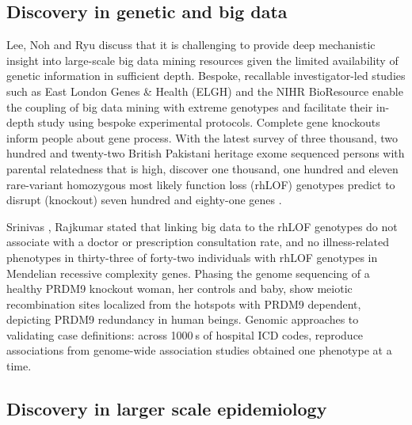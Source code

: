 \documentclass[sigconf]{acmart}
\begin{document}
\subsection{Discovery in genetic and big data}
Lee, Noh and Ryu \cite{lee2011ire1} discuss that it is challenging to provide deep mechanistic insight into large-scale big data mining resources given the limited availability of genetic information in sufficient depth. Bespoke, recallable investigator-led studies such as East London Genes & Health (ELGH) and the NIHR BioResource enable the coupling of big data mining with extreme genotypes and facilitate their in-depth study using bespoke experimental protocols. Complete gene knockouts inform people about gene process. With the latest survey of three thousand, two hundred and twenty-two  British Pakistani heritage exome sequenced persons with parental relatedness that is high, discover one thousand, one hundred and eleven rare-variant homozygous most likely function loss (rhLOF) genotypes predict to disrupt (knockout) seven hundred and eighty-one genes \cite{wang2005framingham}.
\par Srinivas \cite{srinivas2010analysis}, Rajkumar \cite{rajkumar2010diagnosis} stated that linking big data to the rhLOF genotypes do not associate with a doctor or prescription consultation rate, and no illness-related phenotypes in thirty-three of forty-two individuals with rhLOF genotypes in Mendelian recessive complexity genes. Phasing the genome sequencing of a healthy PRDM9 knockout woman, her controls and baby, show meiotic recombination sites localized from the hotspots with PRDM9 dependent, depicting PRDM9 redundancy in human beings. Genomic approaches to validating case definitions: across 1000 s of hospital ICD codes, reproduce associations from genome-wide association studies obtained one phenotype at a time.

\subsection{Discovery in larger scale epidemiology}
\end{document}
